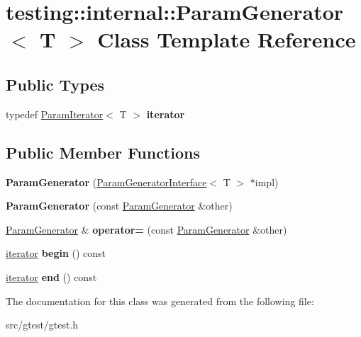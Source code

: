 \hypertarget{classtesting_1_1internal_1_1_param_generator}{}\section{testing\+:\+:internal\+:\+:Param\+Generator$<$ T $>$ Class Template Reference}
\label{classtesting_1_1internal_1_1_param_generator}
\subsection*{Public Types}
\begin{DoxyCompactItemize}
\item 
\mbox{\label{classtesting_1_1internal_1_1_param_generator_a448b08a8eaae1f1d27840d4dbd66c357}} 
typedef \mbox{\hyperlink{classtesting_1_1internal_1_1_param_iterator}{Param\+Iterator}}$<$ T $>$ {\bfseries iterator}
\end{DoxyCompactItemize}
\subsection*{Public Member Functions}
\begin{DoxyCompactItemize}
\item 
\mbox{\label{classtesting_1_1internal_1_1_param_generator_a6b017d4d030927714d495ee95ae92fbc}} 
{\bfseries Param\+Generator} (\mbox{\hyperlink{classtesting_1_1internal_1_1_param_generator_interface}{Param\+Generator\+Interface}}$<$ T $>$ $\ast$impl)
\item 
\mbox{\label{classtesting_1_1internal_1_1_param_generator_a5891d25c31919b3099489f8bbcd58b5e}} 
{\bfseries Param\+Generator} (const \mbox{\hyperlink{classtesting_1_1internal_1_1_param_generator}{Param\+Generator}} \&other)
\item 
\mbox{\label{classtesting_1_1internal_1_1_param_generator_a590a03c6e0a3a3ac6279943ad1f01dc8}} 
\mbox{\hyperlink{classtesting_1_1internal_1_1_param_generator}{Param\+Generator}} \& {\bfseries operator=} (const \mbox{\hyperlink{classtesting_1_1internal_1_1_param_generator}{Param\+Generator}} \&other)
\item 
\mbox{\label{classtesting_1_1internal_1_1_param_generator_a14e735c8bd113556ae905a560cd2d607}} 
\mbox{\hyperlink{classtesting_1_1internal_1_1_param_iterator}{iterator}} {\bfseries begin} () const
\item 
\mbox{\label{classtesting_1_1internal_1_1_param_generator_aaf8f75df1099a07ff771a550b48f9fbe}} 
\mbox{\hyperlink{classtesting_1_1internal_1_1_param_iterator}{iterator}} {\bfseries end} () const
\end{DoxyCompactItemize}


The documentation for this class was generated from the following file\+:\begin{DoxyCompactItemize}
\item 
src/gtest/gtest.\+h\end{DoxyCompactItemize}
